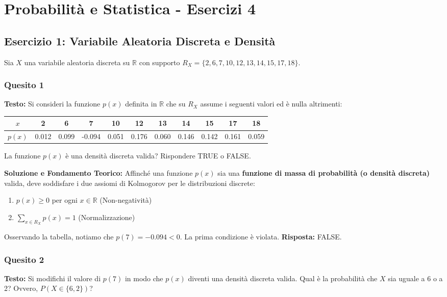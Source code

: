 \documentclass[12pt, a4paper]{article}
\begin{document}
\section*{Probabilità e Statistica - Esercizi 4}

\subsection*{Esercizio 1: Variabile Aleatoria Discreta e Densità}
Sia $X$ una variabile aleatoria discreta su $\mathbb{R}$ con supporto $R_X = \{2, 6, 7, 10, 12, 13, 14, 15, 17, 18\}$.

\subsubsection*{Quesito 1}
\textbf{Testo:} Si consideri la funzione $p(x)$ definita in $\mathbb{R}$ che su $R_X$ assume i seguenti valori ed è nulla altrimenti:
\begin{center}
\begin{tabular}{c|cccccccccc}
\toprule
$x$ & 2 & 6 & 7 & 10 & 12 & 13 & 14 & 15 & 17 & 18 \\
\midrule
$p(x)$ & 0.012 & 0.099 & -0.094 & 0.051 & 0.176 & 0.060 & 0.146 & 0.142 & 0.161 & 0.059 \\
\bottomrule
\end{tabular}
\end{center}
La funzione $p(x)$ è una densità discreta valida? Rispondere TRUE o FALSE.

\textbf{Soluzione e Fondamento Teorico:} 
Affinché una funzione $p(x)$ sia una \textbf{funzione di massa di probabilità (o densità discreta)} valida, deve soddisfare i due assiomi di Kolmogorov per le distribuzioni discrete:
\begin{enumerate}
    \item $p(x) \ge 0$ per ogni $x \in \mathbb{R}$ (Non-negatività)
    \item $\sum_{x \in R_X} p(x) = 1$ (Normalizzazione)
\end{enumerate}
Osservando la tabella, notiamo che $p(7) = -0.094 < 0$. La prima condizione è violata.
\textbf{Risposta:} FALSE.

\subsubsection*{Quesito 2}
\textbf{Testo:} Si modifichi il valore di $p(7)$ in modo che $p(x)$ diventi una densità discreta valida. Qual è la probabilità che $X$ sia uguale a 6 o a 2? Ovvero, $P(X \in \{6,2\})$?
\end{document}
